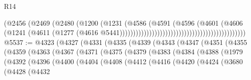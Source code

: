 \begin{lexlean}{R14}
\begin{coremodule}
                                                                      (@2456
                                                                        (@2469
                                                                          (@2480
                                                                            (@1200
                                                                              (@1231
                                                                                (@4586
                                                                                  (@4591
                                                                                    (@4596
                                                                                      (@4601
                                                                                        (@4606
                                                                                          (@1241
                                                                                            (@4611
                                                                                              (@1277
                                                                                                (@4616
                                                                                                  @5441)))))))))))))))))))))))))))))))))))))))))))))))
@5537 := @4323
    (@4327
      (@4331
        (@4335
          (@4339
            (@4343
              (@4347
                (@4351
                  (@4355
                    (@4359
                      (@4363
                        (@4367
                          (@4371
                            (@4375
                              (@4379
                                (@4383
                                  (@4384
                                    (@4388
                                      (@1979
                                        (@4392
                                          (@4396
                                            (@4400
                                              (@4404
                                                (@4408
                                                  (@4412
                                                    (@4416
                                                      (@4420
                                                        (@4424
                                                          (@3680
                                                            (@4428
                                                              (@4432

\end{coremodule}
\end{lexlean}

